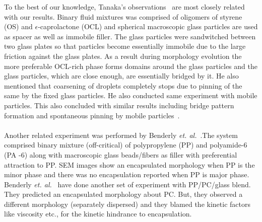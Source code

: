 \documentclass[12pt]{iiscthes}
\theoremstyle{definition}
\theoremstyle{definition}
\theoremstyle{remark}
\begin{document}
To the best of our knowledge, Tanaka's observations~\cite{RTanaka} are most closely related with our results. Binary fluid mixtures was comprised of oligomers of styrene (OS) and $\epsilon$-caprolactone (OCL) and spherical macroscopic glass particles are used as spacer as well as immobile filler. The glass particles were sandwitched between two glass plates so that particles become essentially immobile due to the large friction against the glass plates. As a result during morphology evolution the more preferable OCL-rich phase forms domains around the glass particles and the glass particles, which are close enough, are essentially bridged by it. He also mentioned that coarsening of droplets  completely stops due to pinning of the same by the fixed glass particles. He also conducted same experiment with mobile particles. This also concluded with similar results including bridge pattern formation and spontaneous pinning by mobile particles~\cite{Tanaka}.
\\ \\
Another related experiment was performed by Benderly \emph{et. al.}~\cite{Benderly}.The system comprised binary mixture (off-critical) of polypropylene (PP) and polyamide-6 (PA -6) along with macroscopic glass beads/fibers as filler with preferential attraction to PP. SEM images show an encapsulated morphology when PP is the minor phase and there was no encapsulation reported when PP is major phase. Benderly \emph{et. al.}~\cite{Benderly} have done another set of experiment with PP/PC/glass blend. They predicted an encapsulated morphology about PC. But, they observed a different morphology (separately dispersed) and they blamed the kinetic factors like viscosity etc., for the kinetic hindrance to encapsulation. 
\end{document}
